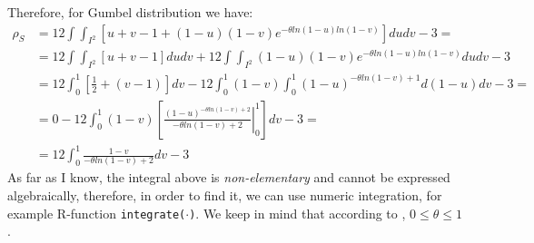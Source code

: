 \documentclass[]{article}
\begin{document}
Therefore, for Gumbel distribution we have:
	$$
	\begin{aligned}
		 \rho_S &= 12\int\int_{I^2}\left[ u+v-1+(1-u)(1-v)e^{-\theta ln(1-u) ln(1-v)} \right]dudv - 3 =\\
     &= 12\int\int_{I^2}\left[ u+v-1 \right]dudv +  12\int\int_{I^2} (1-u)(1-v)e^{-\theta ln(1-u) ln(1-v)} dudv - 3\\
     &= 12\int_0^1\left[ \frac{1}{2} + (v-1) \right]dv -  12\int_0^1(1-v)\int_0^1 (1-u)^{-\theta ln(1-v) + 1} d(1-u)dv - 3 = \\
     &= 0  - 12\int_0^1(1-v)  \left[ \left. \frac{(1-u)^{-\theta ln(1-v) + 2}}{-\theta ln(1-v) + 2}\right|_0^1 \right]  dv - 3 = \\
     &= 12\int_0^1\frac{1-v}{-\theta ln(1-v) + 2}  dv - 3
	\end{aligned}
	$$
As far as I know, the integral above is \emph{non-elementary} and cannot be expressed algebraically, therefore, in order to find it, we can use numeric integration, for example R-function \texttt{integrate($\cdot$)}. We keep in mind that according to \cite{nelsen2007introduction}, $0 \leq \theta \leq 1$.

\end{document}
